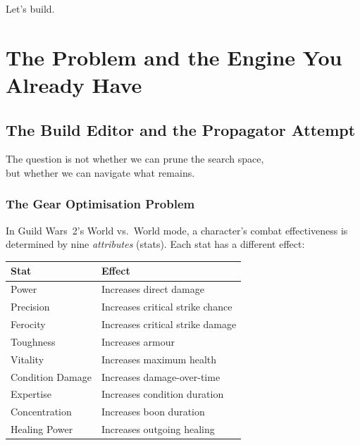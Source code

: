 \documentclass[11pt, a4paper, oneside]{book}
\begin{document}
\bigskip\noindent
Let's build.

\newpage

\part{The Problem and the Engine You Already Have}

\chapter{The Build Editor and the Propagator Attempt}
\label{ch:problem}

\epigraph{The question is not whether we can prune the search space,\\
but whether we can navigate what remains.}{}

\section{The Gear Optimisation Problem}

In Guild Wars~2's World vs.\ World mode, a character's combat effectiveness is
determined by nine \emph{attributes} (stats).  Each stat has a different effect:

\begin{center}
\begin{tabular}{ll}
\toprule
\textbf{Stat} & \textbf{Effect} \\
\midrule
Power & Increases direct damage \\
Precision & Increases critical strike chance \\
Ferocity & Increases critical strike damage \\
Toughness & Increases armour \\
Vitality & Increases maximum health \\
Condition Damage & Increases damage-over-time \\
Expertise & Increases condition duration \\
Concentration & Increases boon duration \\
Healing Power & Increases outgoing healing \\
\bottomrule
\end{tabular}
\end{center}
\end{document}
